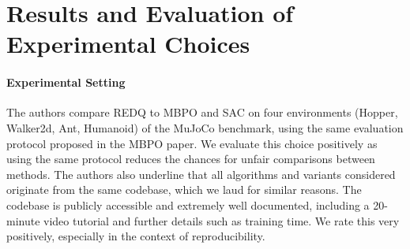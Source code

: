 \documentclass{article}
\begin{document}
\section{Results and Evaluation of Experimental Choices}\label{sec:experiments}

\paragraph{Experimental Setting} The authors compare REDQ to MBPO and SAC on four environments (Hopper, Walker2d, Ant, Humanoid) of the MuJoCo benchmark, using the same evaluation protocol proposed in the MBPO paper. We evaluate this choice positively as using the same protocol reduces the chances for unfair comparisons between methods. The authors also underline that all algorithms and variants considered originate from the same codebase, which we laud for similar reasons. The codebase is publicly accessible and extremely well documented, including a 20-minute video tutorial and further details such as training time. We rate this very positively, especially in the context of reproducibility.
\end{document}
